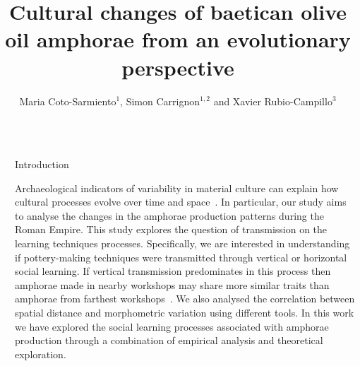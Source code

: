 \documentclass[final]{beamer}
\title{Cultural changes of baetican olive oil amphorae from an evolutionary perspective}
\author{Maria Coto-Sarmiento$^{1}$, Simon Carrignon$^{1,2}$ and Xavier Rubio-Campillo$^{3}$} %
\institute{$^1$Barcelona Supercomputing Center -- $^2$Universitat Pompeu Fabra -- $^3$University of Edinburgh} %
\newlength{\sepwid}
\newlength{\onecolwid}
\begin{document}

\setlength{\belowcaptionskip}{2ex} %
\setlength\belowdisplayshortskip{2ex} %

\begin{frame}[t] %

\vspace{-1cm}

\begin{columns}[t] %

\begin{column}{\sepwid}\end{column} %

\begin{column}{\onecolwid} %


\begin{block}{Introduction}

\justify

Archaeological indicators of variability in material culture can explain how cultural processes evolve over time and space~\cite{lipo}. In particular, our study aims to analyse the changes in the amphorae production patterns during the Roman Empire. This study explores the question of transmission on the learning techniques processes. Specifically, we are interested in understanding if pottery-making techniques were transmitted through vertical or horizontal social learning. If vertical transmission predominates in this process then amphorae made in nearby workshops may share more similar traits than amphorae from farthest workshops~\cite{bjo}. We also analysed the correlation between spatial distance and morphometric variation using different tools. In this work we have explored the social learning processes associated with amphorae production through a combination of empirical analysis and theoretical exploration.   


\end{block}

\vspace{-0.5cm}


\end{column}
\end{columns}
\end{frame}
\end{document}
